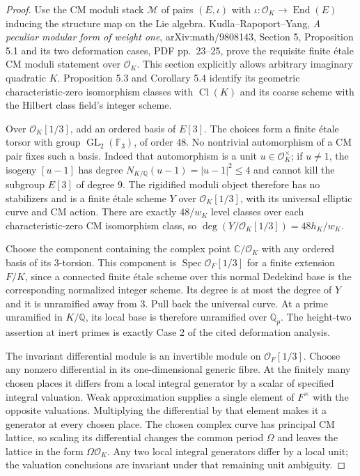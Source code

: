 \documentclass[11pt,a4paper]{article}
\begin{document}
\begin{proof}
Use the CM moduli stack $\mathcal M$ of pairs $(E,\iota)$ with
$\iota:\mathcal O_K\to\operatorname{End}(E)$ inducing the
structure map on the Lie algebra. Kudla--Rapoport--Yang,
\emph{A peculiar modular form of weight one}, arXiv:math/9808143,
Section 5, Proposition 5.1 and its two deformation cases,
PDF pp.~23--25, prove the requisite finite étale CM moduli
statement over $\mathcal O_K$. This section explicitly allows
arbitrary imaginary quadratic $K$. Proposition 5.3 and
Corollary 5.4 identify its geometric characteristic-zero
isomorphism classes with $\operatorname{Cl}(K)$ and its coarse
scheme with the Hilbert class field's integer scheme.

Over $\mathcal O_K[1/3]$, add an ordered basis of $E[3]$.
The choices form a finite étale torsor with group
$\operatorname{GL}_2(\mathbb F_3)$, of order $48$.
No nontrivial automorphism of a CM pair fixes such a basis.
Indeed that automorphism is a unit $u\in\mathcal O_K^\times$;
if $u\ne1$, the isogeny $[u-1]$ has degree
$N_{K/\mathbb Q}(u-1)=|u-1|^2\le4$ and cannot kill the
subgroup $E[3]$ of degree $9$. The rigidified moduli object
therefore has no stabilizers and is a finite étale scheme
$Y$ over $\mathcal O_K[1/3]$, with its universal elliptic curve
and CM action. There are exactly $48/w_K$ level classes over
each characteristic-zero CM isomorphism class, so
$\deg(Y/\mathcal O_K[1/3])=48h_K/w_K$.

Choose the component containing the complex point
$\mathbb C/\mathcal O_K$ with any ordered basis of its
$3$-torsion. This component is
$\operatorname{Spec}\mathcal O_F[1/3]$ for a finite extension
$F/K$, since a connected finite étale scheme over this
normal Dedekind base is the corresponding normalized integer
scheme. Its degree is at most the degree of $Y$ and it is
unramified away from $3$. Pull back the universal curve.
At a prime unramified in $K/\mathbb Q$, its local base is
therefore unramified over $\mathbb Q_p$. The height-two
assertion at inert primes is exactly Case 2 of the cited
deformation analysis.

The invariant differential module is an invertible module on
$\mathcal O_F[1/3]$. Choose any nonzero differential in its
one-dimensional generic fibre. At the finitely many chosen
places it differs from a local integral generator by a scalar
of specified integral valuation. Weak approximation supplies
a single element of $F^\times$ with the opposite valuations.
Multiplying the differential by that element makes it a
generator at every chosen place. The chosen complex curve
has principal CM lattice, so scaling its differential changes
the common period $\Omega$ and leaves the lattice in the form
$\Omega\mathcal O_K$. Any two local integral generators
differ by a local unit; the valuation conclusions are invariant
under that remaining unit ambiguity.
\end{proof}
\end{document}
